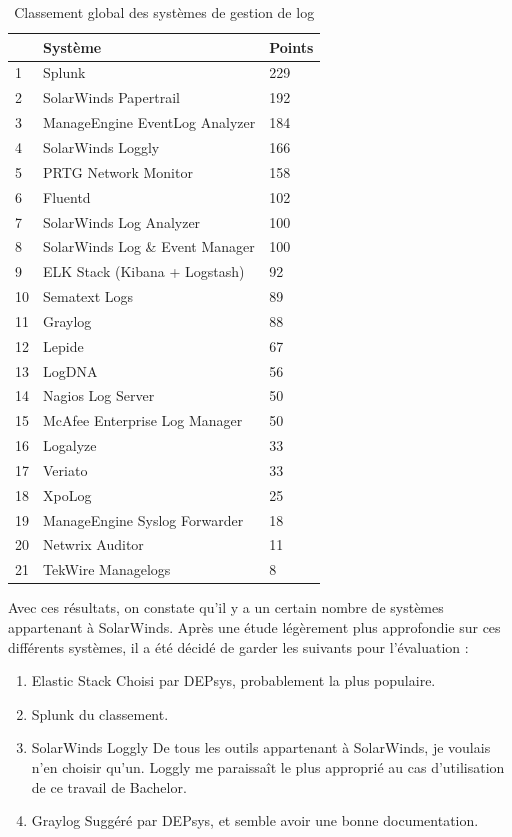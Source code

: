 \documentclass[paper=a4, fontsize=11pt]{scrartcl}
\begin{document}
\centering
\begin{table}
\centering
\begin{tabular}{ |p{2cm}|p{6cm}|p{1cm}| } 
    \hline
     & Système & Points\\
    \hline
    1 & Splunk & 229\\
    2 & SolarWinds Papertrail & 192\\
    3 & ManageEngine EventLog Analyzer & 184\\
    4 & SolarWinds Loggly & 166\\
    5 & PRTG Network Monitor & 158\\
    6 & Fluentd & 102\\
    7 & SolarWinds Log Analyzer & 100\\
    8 & SolarWinds Log \& Event Manager & 100\\
    9 & ELK Stack (Kibana + Logstash)  & 92\\
    10 & Sematext Logs & 89\\
    11 & Graylog & 88\\
    12 & Lepide & 67\\
    13 & LogDNA & 56\\
    14 & Nagios Log Server & 50\\
    15 & McAfee Enterprise Log Manager & 50\\
    16 & Logalyze & 33\\
    17 & Veriato & 33\\
    18 & XpoLog & 25\\
    19 & ManageEngine Syslog Forwarder & 18\\
    20 & Netwrix Auditor & 11\\
    21 & TekWire Managelogs & 8\\
    \hline
\end{tabular}
\caption{Classement global des systèmes de gestion de log}
\label{t-classementGlobal}
\end{table}
\justify

Avec ces résultats, on constate qu'il y a un certain nombre de systèmes appartenant à SolarWinds. Après une étude légèrement plus approfondie sur ces différents systèmes, il a été décidé de garder les suivants pour l'évaluation :

\begin{enumerate}
    \item Elastic Stack
    \subitem Choisi par DEPsys, probablement la plus populaire.
    \item Splunk
     du classement.
    \item SolarWinds Loggly
    \subitem De tous les outils appartenant à SolarWinds, je voulais n'en choisir qu'un. Loggly me paraissaît le plus approprié au cas d'utilisation de ce travail de Bachelor.
    \item Graylog
    \subitem Suggéré par DEPsys, et semble avoir une bonne documentation.
\end{enumerate}
\end{document}

